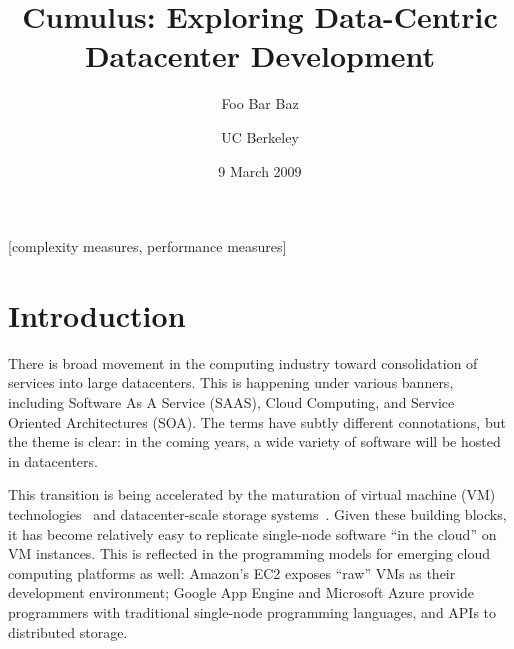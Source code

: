 \documentclass{sig-alternate}
\begin{document}

\newcommand{\BOOM} {Cumulus}
\newcommand{\JOL} {LogJam}

\title{\BOOM: Exploring Data-Centric Datacenter Development}
\author{
\alignauthor
Foo
\alignauthor
Bar
\alignauthor
Baz
\and
UC Berkeley
}
\date{9 March 2009}

\maketitle
\begin{abstract}
\end{abstract}

[complexity measures, performance measures]


\section{Introduction}
There is broad movement in the computing industry toward consolidation of  services into large datacenters.  This is happening under various banners, including Software As A Service (SAAS), Cloud Computing, and Service Oriented Architectures (SOA).  The terms have subtly different connotations, but the theme is clear: in the coming years, a wide variety of software will be hosted in datacenters.

This transition is being accelerated by the maturation of virtual machine (VM) technologies~\cite{vmsurvey} and datacenter-scale storage systems~\cite{GFS,S3,SSDS}.  Given these building blocks, it has become relatively easy to replicate single-node software ``in the cloud'' on VM instances.  This is reflected in the programming models for emerging cloud computing platforms as well: Amazon's EC2 exposes ``raw'' VMs as their development environment; Google App Engine and Microsoft Azure provide programmers with traditional single-node programming languages, and APIs to distributed storage.
\end{document}
